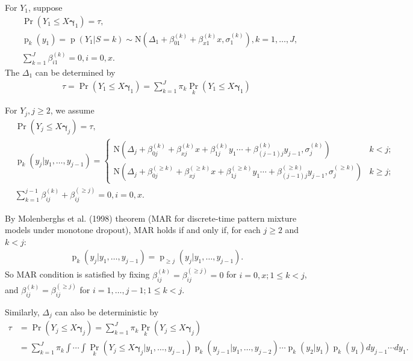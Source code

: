 \documentclass[12pt]{article}
\DeclareMathOperator{\pr}{p}
\DeclareMathOperator{\prob}{Pr}
\begin{document}
For $Y_1$, suppose
\begin{align*}
  & \prob (Y_1 \leq X \bm \gamma_1 )  = \tau ,\\
  & \pr_k(y_1) = \pr(Y_1|S = k)  \sim \textrm{N} (\Delta_1 + \beta_{01}^{(k)} + \beta_{x1}^{(k)}x, \sigma_1^{(k)}), k = 1, \ldots, J,\\
  & \sum_{k=1}^J \beta_{i1}^{(k)} = 0, i = 0, x.
\end{align*}
The $\Delta_1$ can be determined by
\begin{align*}
  \tau = \prob (Y_1 \leq X \bm \gamma_1 ) = \sum_{k=1}^J \pi_k\prob_k (Y_1 \leq X \bm \gamma_1 )
\end{align*}

For $Y_j, j \geq 2$, we assume
\begin{align*}
  &  \prob (Y_j \leq X \bm \gamma_j )  = \tau ,\\
  & \pr_k(y_j|y_1, \ldots, y_{j-1}) =
  \begin{cases}
    \textrm{N} (\Delta_j + \beta_{0j}^{(k)} + \beta_{xj}^{(k)}x + \beta_{1j}^{(k)}y_1 \cdots
    + \beta_{(j-1)j}^{(k)}y_{j-1}, \sigma_j^{(k)}) & k < j ; \\
    \textrm{N} (\Delta_j + \beta_{0j}^{(\geq k)} + \beta_{xj}^{(\geq k)}x +
    \beta_{1j}^{(\geq k)}y_1 \cdots + \beta_{(j-1)j}^{(\geq
      k)}y_{j-1}, \sigma_j^{(\geq k)}) & k \geq j ;
  \end{cases} \\
  & \sum_{k=1}^{j-1} \beta_{ij}^{(k)} + \beta_{ij}^{(\geq j)} = 0, i = 0, x. 
\end{align*}

By Molenberghs et al. (1998) theorem (MAR for discrete-time pattern
mixture models under monotone dropout), MAR holds if and only if, for
each $j \geq 2$ and $k < j$:
\begin{align*}
  \pr_k(y_j|y_1, \ldots, y_{j-1}) = \pr_{\geq j}(y_j|y_1, \ldots, y_{j-1})
  .
\end{align*}
So MAR condition is satisfied by fixing $\beta_{ij}^{(k)} =
\beta_{ij}^{(\geq j)} = 0$ for $i = 0, x ; 1 \leq k < j$, and $\beta_{ij}^{(k)} =
\beta_{ij}^{(\geq j)}$ for $i = 1, \ldots, j-1 ; 1 \leq k < j$.

Similarly, $\Delta_j$ can also be deterministic by
\begin{align*}
  \tau &= \prob (Y_j \leq X \bm \gamma_j ) = \sum_{k=1}^J \pi_k\prob_k (Y_j \leq X \bm \gamma_j ) \\
  & = \sum_{k=1}^J \pi_k \int\cdots \int \prob_k (Y_j \leq X \bm \gamma_j |y_1,\ldots, y_{j-1})
  \pr_k (y_{j-1}| y_1, \ldots, y_{j-2}) \cdots\pr_k (y_{2}| y_1) \pr_k(y_1)
  dy_{j-1}\cdots dy_1.
\end{align*}
\end{document}

